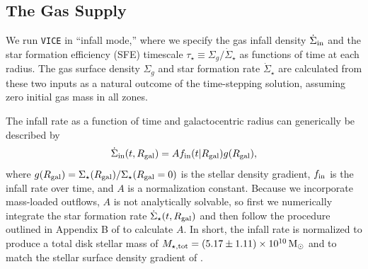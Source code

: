 \documentclass[twocolumn,twocolappendix,linenumbers]{aastex631}
\begin{document}
\subsection{The Gas Supply}
\label{sec:sfh}

We run {\tt VICE} in ``infall mode,'' where we specify the gas infall density $\dot\Sigma_{\rm in}$ and the star formation efficiency (SFE) timescale $\tau_\star\equiv \Sigma_g / \dot\Sigma_\star$ as functions of time at each radius. The gas surface density $\Sigma_g$ and star formation rate $\dot\Sigma_\star$ are calculated from these two inputs as a natural outcome of the time-stepping solution, assuming zero initial gas mass in all zones.

The infall rate as a function of time and galactocentric radius can generically be described by
\begin{equation}
    \label{eq:infall-rate}
    \dot\Sigma_{\rm in}(t,R_{\rm gal}) = A f_{\rm in}(t|R_{\rm gal}) g(R_{\rm gal}),
\end{equation}
where $g(R_{\rm gal})=\Sigma_\star(R_{\rm gal}) / \Sigma_\star(R_{\rm gal}=0)$ is the stellar density gradient, $f_{\rm in}$ is the infall rate over time, and $A$ is a normalization constant. Because we incorporate mass-loaded outflows, $A$ is not analytically solvable, so first we numerically integrate the star formation rate $\dot\Sigma_\star(t,R_{\rm gal})$ and then follow the procedure outlined in Appendix B of \citet{johnson_stellar_2021} to calculate $A$. In short, the infall rate is normalized to produce a total disk stellar mass of $M_{\rm \star,tot}=(5.17\pm1.11)\times 10^{10}\,{\rm M}_\odot$ \citep{licquia_improved_2015} and to match the stellar surface density gradient of \citet{bland-hawthorn_galaxy_2016}.
\end{document}
